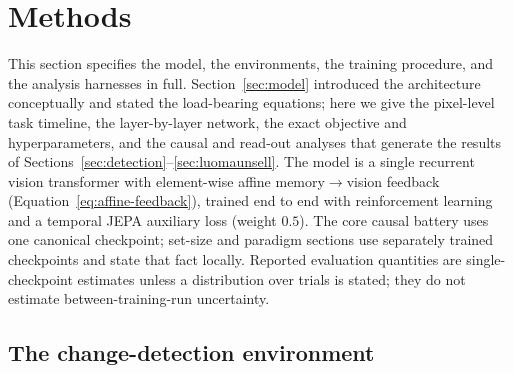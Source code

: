 
\section{Methods}
\label{sec:methods}

This section specifies the model, the environments, the training
procedure, and the analysis harnesses in full. Section~\ref{sec:model}
introduced the architecture conceptually and stated the load-bearing
equations; here we give the pixel-level task timeline, the layer-by-layer
network, the exact objective and hyperparameters, and the causal and
read-out analyses that generate the results of
Sections~\ref{sec:detection}--\ref{sec:luomaunsell}. The model is a single
recurrent vision transformer with element-wise affine memory$\to$vision
feedback (Equation~\ref{eq:affine-feedback}), trained end to end with
reinforcement learning and a temporal JEPA auxiliary loss (weight $0.5$). The core causal battery uses one canonical checkpoint;
set-size and paradigm sections use separately trained checkpoints and state that
fact locally. Reported evaluation quantities are single-checkpoint estimates unless
a distribution over trials is stated; they do not estimate between-training-run
uncertainty.

\subsection{The change-detection environment}
\label{sec:methods-env}

